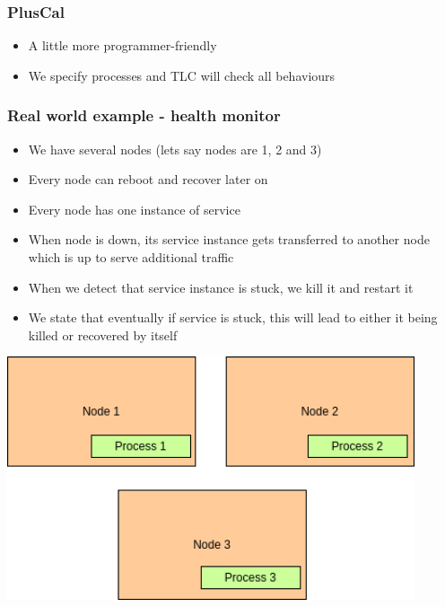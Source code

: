 \documentclass{beamer}
\begin{document}
\begin{frame}
    \frametitle{PlusCal}
    \begin{itemize}
        \item A little more programmer-friendly 
        \item We specify processes and TLC will check all behaviours
    \end{itemize}
\end{frame}


\begin{frame}[fragile]
    \frametitle{Real world example - health monitor}
    \begin{itemize}
        \item We have several nodes (lets say nodes are 1, 2 and 3)
        \item Every node can reboot and recover later on 
        \item Every node has one instance of service 
        \item When node is down, its service instance gets transferred to another node which is up to serve additional traffic
        \item When we detect that service instance is stuck, we kill it and restart it 
        \item We state that eventually if service is stuck, this will lead to either it being killed or recovered by itself
    \end{itemize}
\end{frame}

\begin{frame}
    \includegraphics[width=0.9\textwidth, height=0.9\textheight]{img/scenario_1.drawio.png}
\end{frame}
\end{document}
